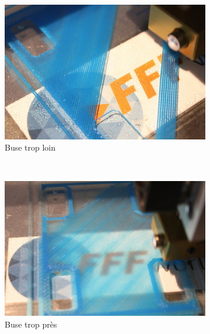 \documentclass[11pt,a4paper]{article}
\begin{document}
\begin{figure}[H]
    \centering
    \begin{subfigure}[b]{0.3\textwidth}
        \includegraphics[width=\textwidth,cfbox=azul_marcos 3pt 0pt]{FOTOS/HOTENDALTO}
	\caption*{Buse trop loin}
    \end{subfigure}
    ~ %
    \begin{subfigure}[b]{0.3\textwidth}
        \includegraphics[width=\textwidth,cfbox=azul_marcos 3pt 0pt]{FOTOS/HOTENDBAJO}
	\caption*{Buse trop près}
    \end{subfigure}
    ~ %
    \begin{subfigure}[b]{0.3\textwidth}

\end{subfigure}
\end{figure}
\end{document}
